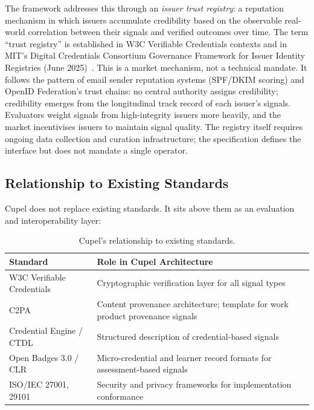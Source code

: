 \documentclass[11pt,a4paper]{article}
\begin{document}
The framework addresses this through an \emph{issuer trust registry}: a reputation mechanism
in which issuers accumulate credibility based on the observable real-world correlation between
their signals and verified outcomes over time. The term ``trust registry'' is established in
W3C Verifiable Credentials contexts and in MIT's Digital Credentials Consortium Governance
Framework for Issuer Identity Registries (June 2025)~\cite{mitdcc2025}. This is a market
mechanism, not a technical mandate. It follows the pattern of email sender reputation systems
(SPF/DKIM scoring) and OpenID Federation's trust chains: no central authority assigns
credibility; credibility emerges from the longitudinal track record of each issuer's signals.
Evaluators weight signals from high-integrity issuers more heavily, and the market incentivises
issuers to maintain signal quality. The registry itself requires ongoing data collection and
curation infrastructure; the specification defines the interface but does not mandate a single
operator.

\subsection{Relationship to Existing Standards}

Cupel does not replace existing standards. It sits above them as an evaluation and
interoperability layer:

\begin{table}[h]
\centering
\small
\begin{tabular}{@{}p{}p{}@{}}
\toprule
\textbf{Standard} & \textbf{Role in Cupel Architecture} \\
\midrule
W3C Verifiable Credentials & Cryptographic verification layer for all signal types \\
C2PA & Content provenance architecture; template for work product provenance signals \\
Credential Engine / CTDL & Structured description of credential-based signals \\
Open Badges 3.0 / CLR & Micro-credential and learner record formats for assessment-based signals \\
ISO/IEC 27001, 29101 & Security and privacy frameworks for implementation conformance \\
\bottomrule
\end{tabular}
\caption{Cupel's relationship to existing standards.}
\end{table}
\end{document}

